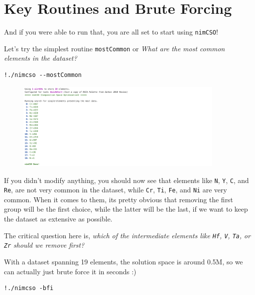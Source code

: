 \hypertarget{key-routines-and-brute-forcing}{
\section{Key Routines and Brute Forcing}\label{nimcsotutorial:key-routines-and-brute-forcing}}

And if you were able to run that, you are all set to start using
\texttt{nimCSO}!

Let's try the simplest routine \texttt{mostCommon} or
\emph{What are the most common elements in the dataset?}

\begin{verbatim}
!./nimcso --mostCommon
\end{verbatim}

\begin{figure}[H]
  \centering
  \includegraphics[width=0.9\textwidth]{nimcsotutorial/3.png}
\end{figure}

If you didn't modify anything, you should now see that elements like
\texttt{N}, \texttt{Y},
\texttt{C}, and \texttt{Re}, are not
very common in the dataset, while \texttt{Cr},
\texttt{Ti}, \texttt{Fe}, and
\texttt{Ni} are very common. When it comes to them, its
pretty obvious that removing the first group will be the first choice,
while the latter will be the last, if we want to keep the dataset as
extensive as possible.

The critical question here is, \emph{which of the intermediate elements
like \texttt{Hf}, \texttt{V},
\texttt{Ta}, or \texttt{Zr} should we
remove first?}

With a dataset spanning 19 elements, the solution space is around 0.5M,
so we can actually just brute force it in seconds :)

\begin{verbatim}
!./nimcso -bfi
\end{verbatim}

